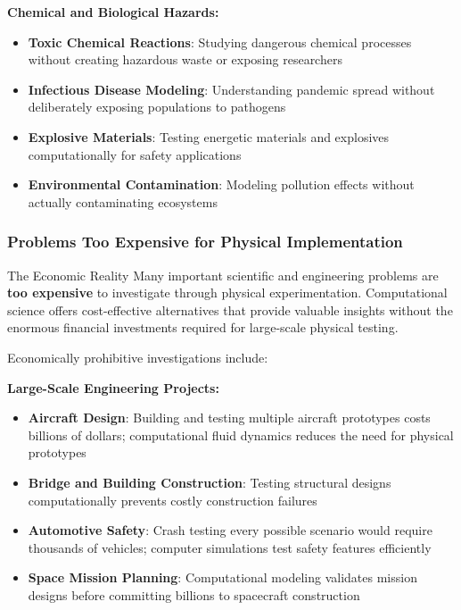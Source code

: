 \textbf{Chemical and Biological Hazards:}
\begin{itemize}
    \item \textbf{Toxic Chemical Reactions}: Studying dangerous chemical processes without creating hazardous waste or exposing researchers
    \item \textbf{Infectious Disease Modeling}: Understanding pandemic spread without deliberately exposing populations to pathogens
    \item \textbf{Explosive Materials}: Testing energetic materials and explosives computationally for safety applications
    \item \textbf{Environmental Contamination}: Modeling pollution effects without actually contaminating ecosystems
\end{itemize}

\subsubsection{Problems Too Expensive for Physical Implementation}

\begin{warningbox}{The Economic Reality}
Many important scientific and engineering problems are \textbf{too expensive} to investigate through physical experimentation. Computational science offers cost-effective alternatives that provide valuable insights without the enormous financial investments required for large-scale physical testing.
\end{warningbox}

Economically prohibitive investigations include:

\textbf{Large-Scale Engineering Projects:}
\begin{itemize}
    \item \textbf{Aircraft Design}: Building and testing multiple aircraft prototypes costs billions of dollars; computational fluid dynamics reduces the need for physical prototypes
    \item \textbf{Bridge and Building Construction}: Testing structural designs computationally prevents costly construction failures
    \item \textbf{Automotive Safety}: Crash testing every possible scenario would require thousands of vehicles; computer simulations test safety features efficiently
    \item \textbf{Space Mission Planning}: Computational modeling validates mission designs before committing billions to spacecraft construction
\end{itemize}

